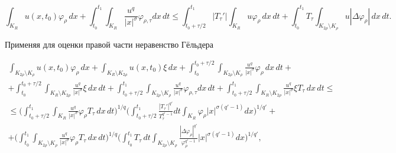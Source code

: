 $$




\int_{K_R} u(x,t_0)\varphi_\rho\,dx+


\int_{t_0}^{t_1}\int_{K_R}\frac{u^q}{|x|^\sigma}\varphi_{\rho,\tau}dx\,dt


\le\int_{t_0+\tau/2}^{t_1}|T_\tau'|\int_{K_R}u\varphi_\rho\,dx\,dt+


\int_{t_0}^{t_1}T_\tau\int_{K_{2\rho}\setminus K_\rho}


u|\Delta\varphi_\rho|\,dx\,dt.




$$


Применяя для оценки правой части неравенство Г\"ельдера


\begin{multline}\label{e:11}


\int_{K_{2\rho}\setminus K_\rho} u(x,t_0)\varphi_\rho\,dx+


\int_{K_R\setminus K_{2\rho}} u(x,t_0)\xi\,dx+


\int_{t_0}^{t_0+\tau/2}\int_{K_{2\rho}\setminus K_\rho}


\frac{u^q}{|x|^\sigma}\varphi_\rho\,dx\,dt+ \\


%


+\int_{t_0}^{t_0+\tau/2}\int_{K_R\setminus K_{2\rho}}


\frac{u^q}{|x|^\sigma}\xi\,dx\,dt+ 


\int_{t_0+\tau/2}^{t_1}\int_{K_{2\rho}\setminus K_\rho}


\frac{u^q}{|x|^\sigma}\varphi_{\rho,\tau}dx\,dt+


\int_{t_0+\tau/2}^{t_1}\int_{K_R\setminus K_{2\rho}}


\frac{u^q}{|x|^\sigma}\xi T_\tau\,dx\,dt \le \\


%


\le


\Bigg(\int_{t_0+\tau/2}^{t_1}\int_{K_R}\frac{u^q}{|x|^\sigma}


\varphi_\rho T_\tau\,dx\,dt\Bigg)^{1/q}


\Bigg(\int_{t_0+\tau/2}^{t_1}


\frac{|T_\tau'|^{q'}}{T_\tau^{q'-1}}dt


\int_{K_R}\varphi_\rho|x|^{\sigma(q'-1)}dx\Bigg)^{1/q'}+\\


%


+\Bigg(\int_{t_0}^{t_1}\int_{K_{2\rho}\setminus K_\rho}


\frac{u^q}{|x|^\sigma}\varphi_\rho T_\tau\,dx\,dt\Bigg)^{1/q}


\Bigg(\int_{t_0}^{t_1}T_\tau\,dt\int_{K_{2\rho}\setminus K_\rho}


\frac{|\Delta\varphi_\rho|^{q'}}{\varphi_\rho^{q'-1}}|x|^{\sigma(q'-1)}dx


\Bigg)^{1/q'},


\end{multline}


